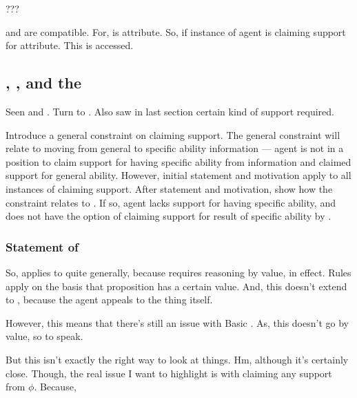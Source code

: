 \begin{note}[Summarising]
  ???
\end{note}

\begin{note}
  \AR{} and \ESU{} are compatible.
  For, \AR{} is attribute.
  So, if instance of \AR{} agent is claiming support for attribute.
  This is accessed.
\end{note}

\subsection{\nI{}, \gsi{}, and the \aben{}}
\label{sec:second-conditional}

\begin{note}
  Seen \ESU{} and \WR{}.
  Turn to \AR{}.
  Also saw in last section certain kind of support required.

  Introduce a general constraint on claiming support.
  The general constraint will relate to moving from general to specific ability information --- agent is not in a position to claim support for having specific ability from information and claimed support for general ability.
  However, initial statement and motivation apply to all instances of claiming support.
  After statement and motivation, show how the constraint relates to \AR{}.
  If so, agent lacks support for having specific ability, and does not have the option of claiming support for result of specific ability by \AR{}.
\end{note}

\subsubsection{Statement of \nI{}}
\label{sec:ni-1}

{
  \color{red}
  So, \nI{} applies to \nr{} quite generally, because \nr{} requires reasoning by value, in effect.
  Rules apply on the basis that proposition has a certain value.
  And, this doesn't extend to \ur{}, because the agent appeals to the thing itself.

  However, this means that there's still an issue with Basic \AR{}.
  As, this doesn't go by value, so to speak.

  But this isn't exactly the right way to look at things.
  Hm, although it's certainly close.
  Though, the real issue I want to highlight is with claiming any support from \(\phi\).
  Because, 
}


